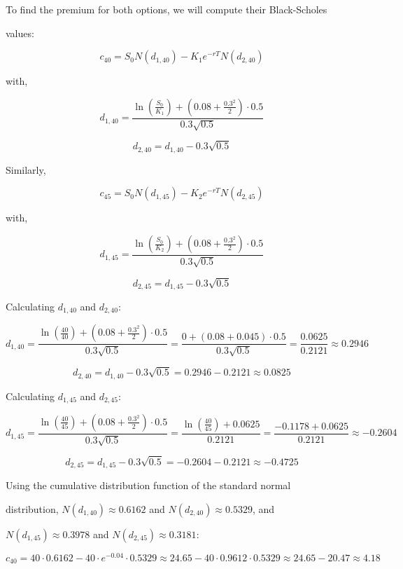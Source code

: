 \documentclass{article}
\begin{document}
\vspace{\baselineskip}

To find the premium for both options, we will compute their Black-Scholes 

values:

\[
c_{40} = S_0 N(d_{1,40}) - K_1 e^{-rT} N(d_{2,40})
\]

with,

\[
d_{1,40} = \frac{\ln\left(\frac{S_0}{K_1}\right) + \left(0.08 + \frac{0.3^2}{2}\right) \cdot 0.5}{0.3 \sqrt{0.5}}
\]

\[
d_{2,40} = d_{1,40} - 0.3 \sqrt{0.5}
\]

Similarly,

\[
c_{45} = S_0 N(d_{1,45}) - K_2 e^{-rT} N(d_{2,45})
\]

with,

\[
d_{1,45} = \frac{\ln\left(\frac{S_0}{K_2}\right) + \left(0.08 + \frac{0.3^2}{2}\right) \cdot 0.5}{0.3 \sqrt{0.5}}
\]

\[
d_{2,45} = d_{1,45} - 0.3 \sqrt{0.5}
\]

Calculating \( d_{1,40} \) and \( d_{2,40} \):

\[
d_{1,40} = \frac{\ln\left(\frac{40}{40}\right) + \left(0.08 + \frac{0.3^2}{2}\right) \cdot 0.5}{0.3 \sqrt{0.5}} = \frac{0 + \left(0.08 + 0.045\right) \cdot 0.5}{0.3 \sqrt{0.5}} = \frac{0.0625}{0.2121} \approx 0.2946
\]

\[
d_{2,40} = d_{1,40} - 0.3 \sqrt{0.5} = 0.2946 - 0.2121 \approx 0.0825
\]

Calculating \( d_{1,45} \) and \( d_{2,45} \):

\[
d_{1,45} = \frac{\ln\left(\frac{40}{45}\right) + \left(0.08 + \frac{0.3^2}{2}\right) \cdot 0.5}{0.3 \sqrt{0.5}} = \frac{\ln\left(\frac{40}{45}\right) + 0.0625}{0.2121} = \frac{-0.1178 + 0.0625}{0.2121} \approx -0.2604
\]

\[
d_{2,45} = d_{1,45} - 0.3 \sqrt{0.5} = -0.2604 - 0.2121 \approx -0.4725
\]

\vspace{\baselineskip}

Using the cumulative distribution function of the standard normal 

distribution, \( N(d_{1,40}) \approx 0.6162 \) and \( N(d_{2,40}) \approx 0.5329 \), and 

\( N(d_{1,45}) \approx 0.3978 \) and \( N(d_{2,45}) \approx 0.3181 \):

\[
c_{40} = 40 \cdot 0.6162 - 40 \cdot e^{-0.04} \cdot 0.5329 \approx 24.65 - 40 \cdot 0.9612 \cdot 0.5329 \approx 24.65 - 20.47 \approx 4.18
\]
\end{document}
